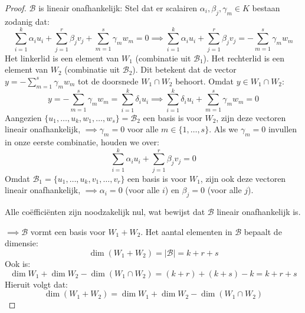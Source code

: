 \begin{proof}
    $\mathcal{B}$ is lineair onafhankelijk:
    Stel dat er scalairen $\alpha_i, \beta_j, \gamma_m \in K$ bestaan zodanig dat:
    $$ \sum_{i=1}^k \alpha_i u_i + \sum_{j=1}^r \beta_j v_j + \sum_{m=1}^s \gamma_m w_m = 0
     \implies \sum_{i=1}^k \alpha_i u_i + \sum_{j=1}^r \beta_j v_j = -\sum_{m=1}^s \gamma_m w_m $$
    Het linkerlid is een element van $W_1$ (combinatie uit $\mathcal{B}_1$). Het rechterlid is een element van $W_2$ (combinatie uit $\mathcal{B}_2$).
    Dit betekent dat de vector $y = -\sum_{m=1}^s \gamma_m w_m$ tot de doorsnede $W_1 \cap W_2$ behoort.
    Omdat $y \in W_1 \cap W_2$:
    $$ y = -\sum_{m=1}^s \gamma_m w_m = \sum_{i=1}^k \delta_i u_i
    \implies \sum_{i=1}^k \delta_i u_i + \sum_{m=1}^s \gamma_m w_m = 0 $$
    Aangezien $\{u_1, \dots, u_k, w_1, \dots, w_s\} = \mathcal{B}_2$ een basis is voor $W_2$,
    zijn deze vectoren lineair onafhankelijk, $\implies \gamma_m = 0$ voor alle $m \in \{1, \dots, s\}$.
    Als we $\gamma_m = 0$ invullen in onze eerste combinatie, houden we over:
    $$ \sum_{i=1}^k \alpha_i u_i + \sum_{j=1}^r \beta_j v_j = 0 $$
    Omdat $\mathcal{B}_1 = \{u_1, \dots, u_k, v_1, \dots, v_r\}$ een basis is voor $W_1$,
    zijn ook deze vectoren lineair onafhankelijk,  $\implies \alpha_i = 0$ (voor alle $i$) en $\beta_j = 0$ (voor alle $j$).

    Alle coëfficiënten zijn noodzakelijk nul, wat bewijst dat $\mathcal{B}$ lineair onafhankelijk is.

    \(\implies \mathcal{B}\) vormt een basis voor $W_1 + W_2$. Het aantal elementen in $\mathcal{B}$ bepaalt de dimensie:
    $$ \dim(W_1 + W_2) = |\mathcal{B}| = k + r + s $$
    Ook is:
    $$ \dim W_1 + \dim W_2 - \dim(W_1 \cap W_2) = (k + r) + (k + s) - k = k + r + s $$
    Hieruit volgt dat:
    $$ \dim(W_1 + W_2) = \dim W_1 + \dim W_2 - \dim(W_1 \cap W_2) $$
\end{proof}


